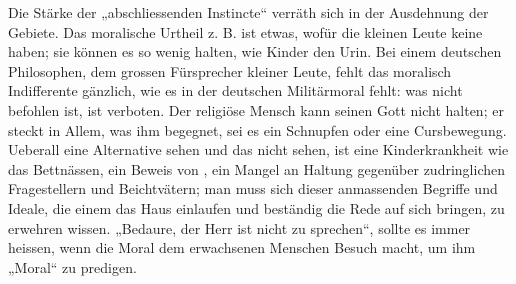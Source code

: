 Die Stärke der „abschliessenden Instincte“ verräth sich in der Ausdehnung der  Gebiete. Das moralische Urtheil z. B. ist etwas, wofür die kleinen Leute keine  haben; sie können es so wenig halten, wie Kinder den Urin. Bei einem deutschen Philosophen, dem grossen Fürsprecher kleiner Leute, fehlt das moralisch Indifferente gänzlich, wie es in der deutschen Militärmoral fehlt: was nicht befohlen ist, ist verboten. Der religiöse Mensch kann seinen Gott nicht halten; er steckt in Allem, was ihm begegnet, sei es ein Schnupfen oder eine Cursbewegung. Ueberall eine Alternative sehen und das  nicht sehen, ist eine Kinderkrankheit wie das Bettnässen, ein Beweis von , ein Mangel an Haltung gegenüber zudringlichen Fragestellern und Beichtvätern; man muss sich dieser anmassenden Begriffe und Ideale, die einem das Haus einlaufen und beständig die Rede auf sich bringen, zu erwehren wissen. „Bedaure, der Herr ist nicht zu sprechen“, sollte es immer heissen, wenn die Moral dem erwachsenen Menschen Besuch macht, um ihm „Moral“ zu predigen.
\par


